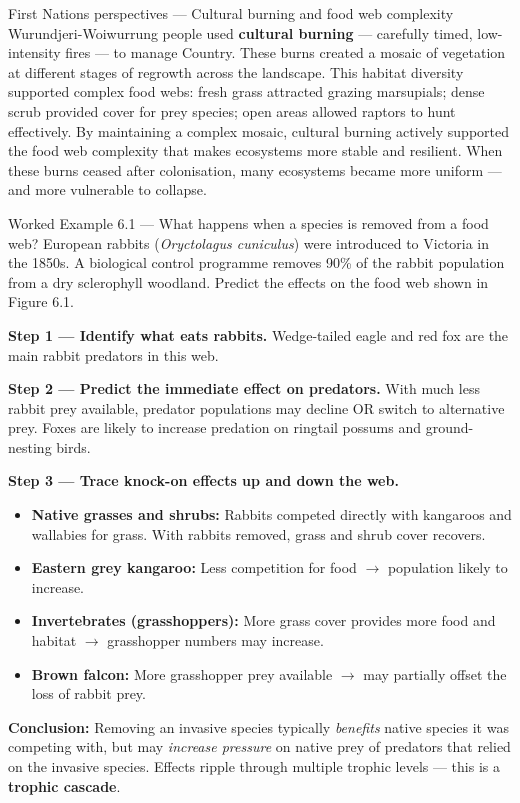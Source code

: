 \documentclass[11pt,a4paper]{article}
\begin{document}
\begin{fnbox}{First Nations perspectives --- Cultural burning and food web complexity}
Wurundjeri-Woiwurrung people used \textbf{cultural burning} --- carefully timed, low-intensity fires --- to manage Country. These burns created a mosaic of vegetation at different stages of regrowth across the landscape. This habitat diversity supported complex food webs: fresh grass attracted grazing marsupials; dense scrub provided cover for prey species; open areas allowed raptors to hunt effectively. By maintaining a complex mosaic, cultural burning actively supported the food web complexity that makes ecosystems more stable and resilient. When these burns ceased after colonisation, many ecosystems became more uniform --- and more vulnerable to collapse.
\end{fnbox}
\newpage
\begin{workedex}{Worked Example 6.1 --- What happens when a species is removed from a food web?}
European rabbits (\textit{Oryctolagus cuniculus}) were introduced to Victoria in the 1850s. A biological control programme removes 90\% of the rabbit population from a dry sclerophyll woodland. Predict the effects on the food web shown in Figure 6.1.

\medskip
\textbf{Step 1 --- Identify what eats rabbits.}
Wedge-tailed eagle and red fox are the main rabbit predators in this web.

\medskip
\textbf{Step 2 --- Predict the immediate effect on predators.}
With much less rabbit prey available, predator populations may decline OR switch to alternative prey. Foxes are likely to increase predation on ringtail possums and ground-nesting birds.

\medskip
\textbf{Step 3 --- Trace knock-on effects up and down the web.}
\begin{itemize}[itemsep=2pt]
  \item \textbf{Native grasses and shrubs:} Rabbits competed directly with kangaroos and wallabies for grass. With rabbits removed, grass and shrub cover recovers.
  \item \textbf{Eastern grey kangaroo:} Less competition for food $\rightarrow$ population likely to increase.
  \item \textbf{Invertebrates (grasshoppers):} More grass cover provides more food and habitat $\rightarrow$ grasshopper numbers may increase.
  \item \textbf{Brown falcon:} More grasshopper prey available $\rightarrow$ may partially offset the loss of rabbit prey.
\end{itemize}

\medskip
\textbf{Conclusion:} Removing an invasive species typically \textit{benefits} native species it was competing with, but may \textit{increase pressure} on native prey of predators that relied on the invasive species. Effects ripple through multiple trophic levels --- this is a \textbf{trophic cascade}.
\end{workedex}
\end{document}

